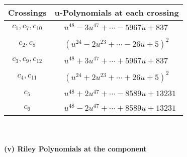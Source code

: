 \documentclass[1p]{elsarticle_modified}
\theoremstyle{definition}
\begin{document}
\begin{tabular}{m{50pt}|m{274pt}}
Crossings & \hspace{64pt}u-Polynomials at each crossing \\
\hline $$\begin{aligned}c_{1},c_{7},c_{10}\end{aligned}$$&$\begin{aligned}
&u^{48}-3 u^{47}+\cdots-5967 u+837
\end{aligned}$\\
\hline $$\begin{aligned}c_{2},c_{8}\end{aligned}$$&$\begin{aligned}
&(u^{24}-2 u^{23}+\cdots-26 u+5)^{2}
\end{aligned}$\\
\hline $$\begin{aligned}c_{3},c_{9},c_{12}\end{aligned}$$&$\begin{aligned}
&u^{48}+3 u^{47}+\cdots+5967 u+837
\end{aligned}$\\
\hline $$\begin{aligned}c_{4},c_{11}\end{aligned}$$&$\begin{aligned}
&(u^{24}+2 u^{23}+\cdots+26 u+5)^{2}
\end{aligned}$\\
\hline $$\begin{aligned}c_{5}\end{aligned}$$&$\begin{aligned}
&u^{48}+2 u^{47}+\cdots-8589 u+13231
\end{aligned}$\\
\hline $$\begin{aligned}c_{6}\end{aligned}$$&$\begin{aligned}
&u^{48}-2 u^{47}+\cdots+8589 u+13231
\end{aligned}$\\
\hline
\end{tabular}\\~\\
\newpage\renewcommand{\arraystretch}{1}
\flushleft \textbf{(v) Riley Polynomials at the component}\newline \\
\end{document}
